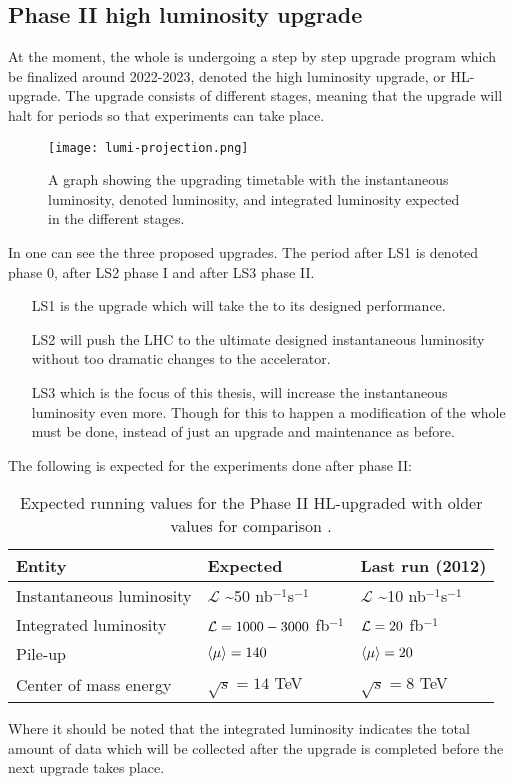 \subsection{Phase II high luminosity upgrade}\label{sec:eo:subsec:hlu}
At the moment, the whole \abbrLHC is undergoing a step by step upgrade program which be finalized around 2022-2023, denoted the high luminosity upgrade, or HL-upgrade. The upgrade consists of different stages, meaning that the upgrade will halt for periods so that experiments can take place. 
\begin{figure}[ht]
\texttt{[image: lumi-projection.png]}
\caption{A graph showing the upgrading timetable with the instantaneous luminosity, denoted luminosity, and integrated luminosity expected in the different stages.}
\label{fig:upgt}
\end{figure}
In  one can see the three proposed upgrades. The period after LS1 is denoted phase 0, after LS2 phase I and after LS3 phase II. 
\begin{itemize}
\item[LS1] is the upgrade which will take the \abbrLHC to its designed performance. 

\item[LS2] will push the LHC to the ultimate designed instantaneous luminosity without too dramatic changes to the accelerator. 
\item[LS3] which is the focus of this thesis, will increase the instantaneous luminosity even more. Though for this to happen a modification of the whole \abbrLHC must be done, instead of just an upgrade and maintenance as before.
\end{itemize}
The following is expected for the experiments done after phase II:
\renewcommand{\arraystretch}{1.5} %
\begin{table}[H]
\begin{center}
    \begin{tabular}{ | l | l | l |}
    \hline
    Entity & Expected & Last run (2012) \\ \hline
    Instantaneous luminosity & $\mathscr{L}$ \textasciitilde 50 nb$^{-1}$s$^{-1}$ & $\mathscr{L}$ \textasciitilde 10 nb$^{-1}$s$^{-1}$ \\ \hline  
    Integrated luminosity & $\mathcal{L}=1000-3000$ fb$^{-1}$ & $\mathcal{L}=20$ fb$^{-1}$ \\ \hline
  	Pile-up & $\left<\mu\right>=140$ & $\left<\mu\right>=20$ \\ \hline
  	Center of mass energy & $\sqrt{s}=14$ TeV &  $\sqrt{s}=8$ TeV \\ \hline
  	\end{tabular}
  	
  	\caption{Expected running values for the Phase II HL-upgraded \abbrLHC with older values for comparison \citep{HL:2013}.}
  	\label{tab:expectvalues}
  	\end{center}
    \end{table}
    \renewcommand{\arraystretch}{1.0}  %
Where it should be noted that the integrated luminosity indicates the total amount of data which will be collected after the upgrade is completed before the next upgrade takes place. 

